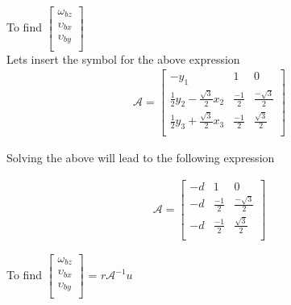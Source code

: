 \documentclass{article}
\begin{document}
To find
$
    \begin{bmatrix}
        \omega_{bz}   \\
        \upsilon_{bx} \\
        \upsilon_{by} \\
    \end{bmatrix}
$\\

Lets insert the symbol for the above expression
\begin{align}
    \mathcal{A}  =
    \begin{bmatrix}
        -y_1                                   & 1            & 0                    \\
        \frac{1}{2}y_2 - \frac{\sqrt{3}}{2}x_2 & \frac{-1}{2} & \frac{- \sqrt{3}}{2} \\
        \frac{1}{2}y_3 + \frac{\sqrt{3}}{2}x_3 & \frac{-1}{2} & \frac{ \sqrt{3}}{2}  \\
    \end{bmatrix}
\end{align}

Solving the above will lead to the following expression

\begin{align}
    \mathcal{A} =
    \begin{bmatrix}
        -d & 1            & 0                    \\
        -d & \frac{-1}{2} & \frac{- \sqrt{3}}{2} \\
        -d & \frac{-1}{2} & \frac{\sqrt{3}}{2}   \\
    \end{bmatrix}
\end{align}

To find
$
    \begin{bmatrix}
        \omega_{bz}   \\
        \upsilon_{bx} \\
        \upsilon_{by} \\
    \end{bmatrix}
$ = $r\mathcal{A}^{-1} u$
\end{document}
